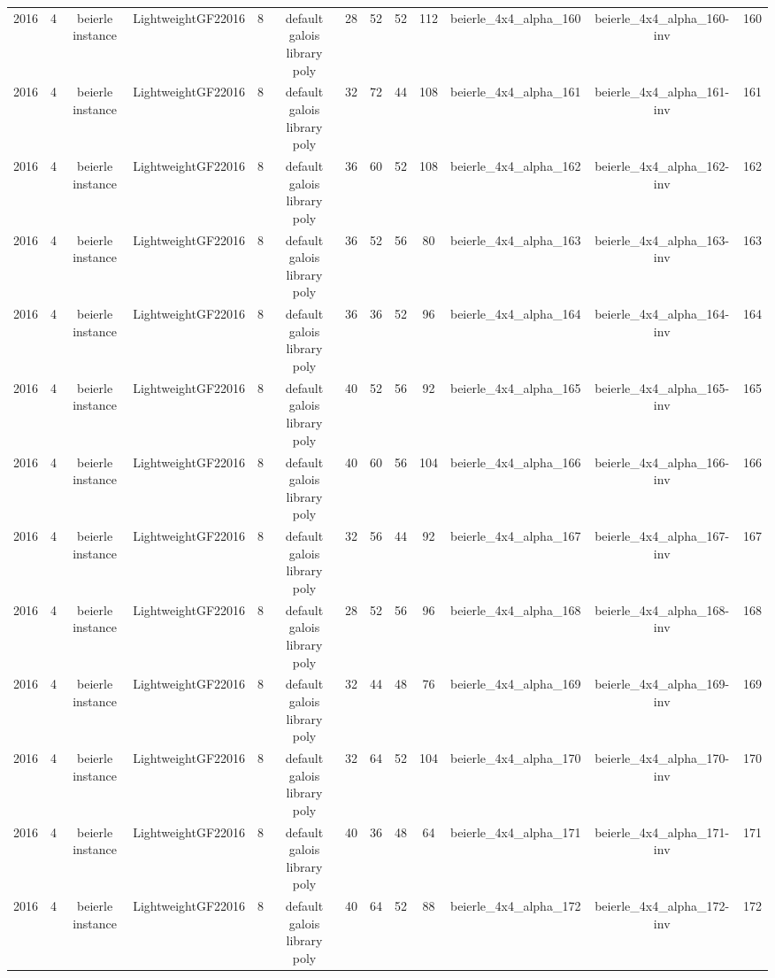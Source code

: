 \begin{tabular}{c c c c c c c c c c c c c}
2016 & 4 & beierle instance & LightweightGF22016 & 8 & default galois library poly & 28 & 52 & 52 & 112 & beierle_4x4_alpha_160 & beierle_4x4_alpha_160-inv & 160 \\
2016 & 4 & beierle instance & LightweightGF22016 & 8 & default galois library poly & 32 & 72 & 44 & 108 & beierle_4x4_alpha_161 & beierle_4x4_alpha_161-inv & 161 \\
2016 & 4 & beierle instance & LightweightGF22016 & 8 & default galois library poly & 36 & 60 & 52 & 108 & beierle_4x4_alpha_162 & beierle_4x4_alpha_162-inv & 162 \\
2016 & 4 & beierle instance & LightweightGF22016 & 8 & default galois library poly & 36 & 52 & 56 & 80 & beierle_4x4_alpha_163 & beierle_4x4_alpha_163-inv & 163 \\
2016 & 4 & beierle instance & LightweightGF22016 & 8 & default galois library poly & 36 & 36 & 52 & 96 & beierle_4x4_alpha_164 & beierle_4x4_alpha_164-inv & 164 \\
2016 & 4 & beierle instance & LightweightGF22016 & 8 & default galois library poly & 40 & 52 & 56 & 92 & beierle_4x4_alpha_165 & beierle_4x4_alpha_165-inv & 165 \\
2016 & 4 & beierle instance & LightweightGF22016 & 8 & default galois library poly & 40 & 60 & 56 & 104 & beierle_4x4_alpha_166 & beierle_4x4_alpha_166-inv & 166 \\
2016 & 4 & beierle instance & LightweightGF22016 & 8 & default galois library poly & 32 & 56 & 44 & 92 & beierle_4x4_alpha_167 & beierle_4x4_alpha_167-inv & 167 \\
2016 & 4 & beierle instance & LightweightGF22016 & 8 & default galois library poly & 28 & 52 & 56 & 96 & beierle_4x4_alpha_168 & beierle_4x4_alpha_168-inv & 168 \\
2016 & 4 & beierle instance & LightweightGF22016 & 8 & default galois library poly & 32 & 44 & 48 & 76 & beierle_4x4_alpha_169 & beierle_4x4_alpha_169-inv & 169 \\
2016 & 4 & beierle instance & LightweightGF22016 & 8 & default galois library poly & 32 & 64 & 52 & 104 & beierle_4x4_alpha_170 & beierle_4x4_alpha_170-inv & 170 \\
2016 & 4 & beierle instance & LightweightGF22016 & 8 & default galois library poly & 40 & 36 & 48 & 64 & beierle_4x4_alpha_171 & beierle_4x4_alpha_171-inv & 171 \\
2016 & 4 & beierle instance & LightweightGF22016 & 8 & default galois library poly & 40 & 64 & 52 & 88 & beierle_4x4_alpha_172 & beierle_4x4_alpha_172-inv & 172 \\

\end{tabular}
